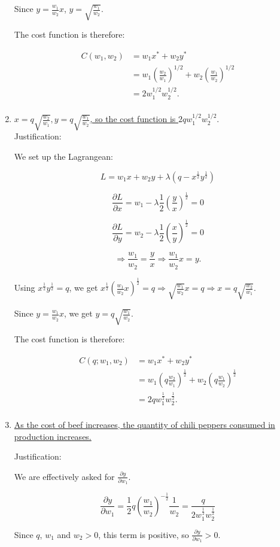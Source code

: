 \documentclass{article}
\newenvironment{solution}{\color{red}}{\color{black}}
\begin{document}
\begin{solution}
\begin{enumerate}
Since $y=\frac{w_1}{w_2}x$, $y=\sqrt{\frac{w_1}{w_2}}$.

The cost function is therefore:

\begin{align*}
C(w_1, w_2) &= w_1x^{*}+w_2y^{*} \\
 &= w_1\left( \frac{w_2}{w_1} \right)^{1/2}+w_2\left( \frac{w_1}{w_2} \right)^{1/2} \\
 &= 2w_1^{1/2}w_2^{1/2}.\\ 
\end{align*}

\item\underline{ $x=q\sqrt{\frac{w_2}{w_1}}, y=q\sqrt{\frac{w_1}{w_2}}$, so the cost function is $2qw_1^{1/2}w_2^{1/2}. $}\\

Justification:

We set up the Lagrangean:

\[ L=w_1x+w_2y+\lambda\left( q-x^\frac12 y^\frac12 \right) \]

\[ \frac{\partial L}{\partial x}=w_1-\lambda\frac12\left( \frac{y}{x} \right)^\frac12 =0 \]

\[ \frac{\partial L}{\partial y}=w_2-\lambda\frac12\left( \frac{x}{y} \right)^\frac12=0 \]

\[ \Rightarrow \frac{w_1}{w_2}=\frac{y}{x} \Rightarrow \frac{w_1}{w_2}x=y. \]

Using $x^\frac12 y^\frac12=q$, we get $x^\frac12\left( \frac{w_1}{w_2}x \right)^\frac12=q \Rightarrow  \sqrt{\frac{w_1}{w_2}}x=q \Rightarrow  x=q\sqrt{\frac{w_2}{w_1}}$.

Since $y=\frac{w_1}{w_2}x$, we get $y=q\sqrt{\frac{w_1}{w_2}}$.

The cost function is therefore:

\begin{align*}
C(q; w_1, w_2) &= w_1x^{*}+w_2y^{*} \\
 &=w_1\left( q\frac{w_2}{w_1} \right)^\frac12+w_2\left( q\frac{w_1}{w_2} \right)^\frac12 \\
 &=2qw_1^\frac12 w_2^\frac12.\\ 
\end{align*}

\item\underline{As the cost of beef increases, the quantity of chili peppers consumed in production increases.}

Justification:

We are effectively asked for $\frac{\partial y}{\partial w_1}$.

\[ \frac{\partial y}{\partial w_1}=\frac12 q\left( \frac{w_1}{w_2} \right)^{-\frac12}\frac{1}{w_2}=\frac{q}{2w_1^\frac12 w_2^\frac12 } \]

Since $q$, $w_1$ and $w_2>0$, this term is positive, so $\frac{\partial y}{\partial w_1}>0$.
\end{enumerate}

\end{solution}
\end{document}
